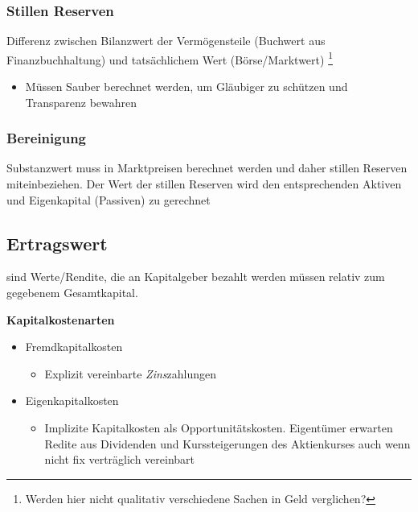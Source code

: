 \subsubsection{Stillen Reserven}
\begin{definition}
     Differenz zwischen Bilanzwert der Vermögensteile (Buchwert aus Finanzbuchhaltung) und tatsächlichem Wert (Börse/Marktwert) \footnote{Werden hier nicht qualitativ verschiedene Sachen in Geld verglichen?}
\end{definition}
\begin{itemize}
    \item Müssen Sauber berechnet werden, um Gläubiger zu schützen und Transparenz bewahren
\end{itemize}

\subsubsection{Bereinigung}
Substanzwert muss in Marktpreisen berechnet werden und daher stillen Reserven miteinbeziehen. Der Wert der stillen Reserven wird den entsprechenden Aktiven und Eigenkapital (Passiven) zu gerechnet
\subsection{Ertragswert}

\begin{definition}
    [Kapitalkosten] sind Werte/Rendite, die an Kapitalgeber bezahlt werden müssen relativ zum gegebenem Gesamtkapital.
\end{definition}
\textbf{Kapitalkostenarten}
\begin{itemize}
    \item Fremdkapitalkosten
    \begin{itemize}
        \item Explizit vereinbarte \textit{Zins}zahlungen
    \end{itemize}
    \item Eigenkapitalkosten
    \begin{itemize}
        \item Implizite Kapitalkosten als Opportunitätskosten. Eigentümer erwarten Redite aus Dividenden und Kurssteigerungen des Aktienkurses auch wenn nicht fix verträglich vereinbart
    \end{itemize}
\end{itemize}

